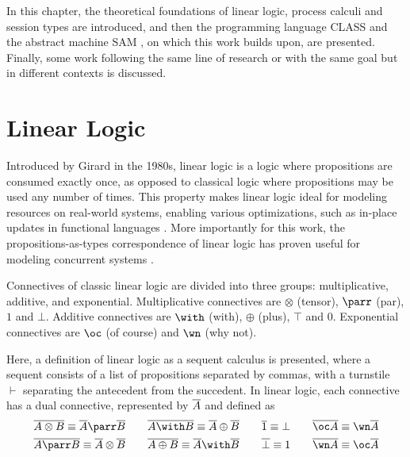\label{chap:back}

In this chapter, the theoretical foundations of linear logic, process calculi and session types are introduced, and then the programming language \ac{CLASS} \cite{Rocha:2021} and the abstract machine \ac{SAM} \cite{Caires:2024}, on which this work builds upon, are presented. Finally, some work following the same line of research or with the same goal but in different contexts is discussed.

\section{Linear Logic}

Introduced by Girard \cite{Girard:1987} in the 1980s, linear logic is a logic where propositions are consumed exactly once, as opposed to classical logic where propositions may be used any number of times. This property makes linear logic ideal for modeling resources on real-world systems, enabling various optimizations, such as in-place updates in functional languages \cite{Hofmann:2000}. More importantly for this work, the propositions-as-types correspondence of linear logic has proven useful for modeling concurrent systems \cite{Caires:2010}.

Connectives of classic linear logic are divided into three groups: multiplicative, additive, and exponential. Multiplicative connectives are $\otimes$ (tensor), $\parr$ (par), $1$ and $\bot$. Additive connectives are $\with$ (with), $\oplus$ (plus), $\top$ and $0$. Exponential connectives are $\oc$ (of course) and $\wn$ (why not).

Here, a definition of linear logic as a sequent calculus \cite{Abramsky:1993} is presented, where a sequent consists of a list of propositions separated by commas, with a turnstile $\vdash$ separating the antecedent from the succedent. In linear logic, each connective has a dual connective, represented by $\overline{A}$ and defined as \[\begin{aligned}
& \dual{A \otimes B} \equiv \dual{A} \parr \dual{B}
\quad
&& \dual{A \with B} \equiv \dual{A} \oplus \dual{B}
\quad
&& \dual{1} \equiv \bot
\quad
&& \dual{\oc A} \equiv \wn \dual{A}
\\
& \dual{A \parr B} \equiv \dual{A} \otimes \dual{B}
\quad
&& \dual{A \oplus B} \equiv \dual{A} \with \dual{B}
\quad
&& \dual{\bot} \equiv 1
\quad
&& \dual{\wn A} \equiv \oc \dual{A}
\end{aligned}\]

